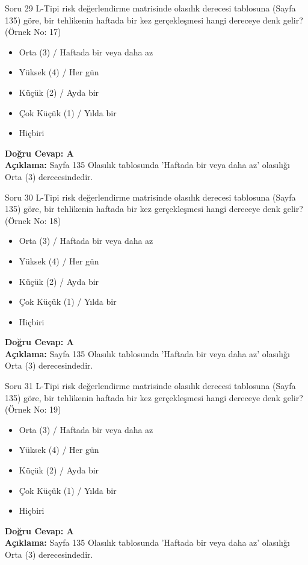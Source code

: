 \documentclass[12pt,a4paper]{article}
\begin{document}
\begin{testcard}{Soru 29}
    L-Tipi risk değerlendirme matrisinde olasılık derecesi tablosuna (Sayfa 135) göre, bir tehlikenin haftada bir kez gerçekleşmesi hangi dereceye denk gelir? (Örnek No: 17)
    \begin{itemize}
        \item[A)] Orta (3) / Haftada bir veya daha az
        \item[B)] Yüksek (4) / Her gün
        \item[C)] Küçük (2) / Ayda bir
        \item[D)] Çok Küçük (1) / Yılda bir
        \item[E)] Hiçbiri
    \end{itemize}
    \tcblower
    \textbf{Doğru Cevap: A} \\
    \textbf{Açıklama:} Sayfa 135 Olasılık tablosunda 'Haftada bir veya daha az' olasılığı Orta (3) derecesindedir.
\end{testcard}

\begin{testcard}{Soru 30}
    L-Tipi risk değerlendirme matrisinde olasılık derecesi tablosuna (Sayfa 135) göre, bir tehlikenin haftada bir kez gerçekleşmesi hangi dereceye denk gelir? (Örnek No: 18)
    \begin{itemize}
        \item[A)] Orta (3) / Haftada bir veya daha az
        \item[B)] Yüksek (4) / Her gün
        \item[C)] Küçük (2) / Ayda bir
        \item[D)] Çok Küçük (1) / Yılda bir
        \item[E)] Hiçbiri
    \end{itemize}
    \tcblower
    \textbf{Doğru Cevap: A} \\
    \textbf{Açıklama:} Sayfa 135 Olasılık tablosunda 'Haftada bir veya daha az' olasılığı Orta (3) derecesindedir.
\end{testcard}

\begin{testcard}{Soru 31}
    L-Tipi risk değerlendirme matrisinde olasılık derecesi tablosuna (Sayfa 135) göre, bir tehlikenin haftada bir kez gerçekleşmesi hangi dereceye denk gelir? (Örnek No: 19)
    \begin{itemize}
        \item[A)] Orta (3) / Haftada bir veya daha az
        \item[B)] Yüksek (4) / Her gün
        \item[C)] Küçük (2) / Ayda bir
        \item[D)] Çok Küçük (1) / Yılda bir
        \item[E)] Hiçbiri
    \end{itemize}
    \tcblower
    \textbf{Doğru Cevap: A} \\
    \textbf{Açıklama:} Sayfa 135 Olasılık tablosunda 'Haftada bir veya daha az' olasılığı Orta (3) derecesindedir.
\end{testcard}
\end{document}
